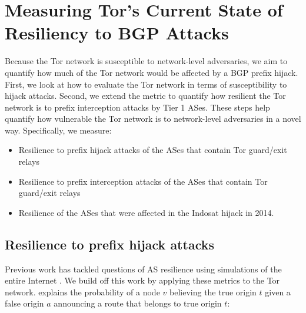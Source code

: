 \section{Measuring Tor's Current State of Resiliency to BGP Attacks}
\label{hijack_interception_measurement}

Because the Tor network is susceptible to network-level adversaries, we aim to quantify how much of the Tor network would be affected by a BGP prefix hijack.  First, we look at how to evaluate the Tor network in terms of susceptibility to hijack attacks. Second, we extend the metric to quantify how resilient the Tor network is to prefix interception attacks by Tier 1 ASes. These steps help quantify how vulnerable the Tor network is to network-level adversaries in a novel way.  Specifically, we measure:

\begin{itemize}
\item Resilience to prefix hijack attacks of the ASes that contain Tor guard/exit relays
\item Resilience to prefix interception attacks of the ASes that contain Tor guard/exit relays
\item Resilience of the ASes that were affected in the Indosat hijack in 2014. 
\end{itemize}

\subsection{Resilience to prefix hijack attacks}
\label{hijack_methodology}

Previous work has tackled questions of AS resilience using simulations of the entire Internet \cite{lad2007understanding}.  We build off this work by applying these metrics to the Tor network. \cite{lad2007understanding} explains the probability of a node $v$ believing the true origin $t$ given a false origin $a$ announcing a route that belongs to true origin $t$:

